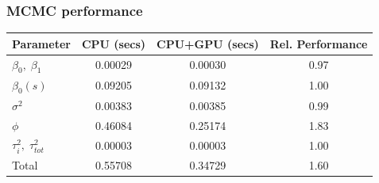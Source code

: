 \documentclass[t]{beamer}\usepackage[]{graphicx}\usepackage[]{color}
\begin{document}
\begin{frame}
\frametitle{MCMC performance}

\begin{center}
\renewcommand*{\arraystretch}{1.5}
\begin{tabular}{l|c|c|c}
Parameter                 & CPU (secs) & CPU+GPU (secs)  & Rel. Performance \\
\hline
$\beta_0, \; \beta_1$     & 0.00029    & 0.00030         & 0.97 \\
$\beta_0(s) $             & 0.09205    & 0.09132         & 1.00 \\
$\sigma^2$                & 0.00383    & 0.00385         & 0.99 \\
$\phi$                    & 0.46084    & 0.25174         & 1.83 \\
$\tau^2_i,\; \tau^2_{tot}$& 0.00003    & 0.00003         & 1.00 \\
\hline
Total                     & 0.55708    & 0.34729         & 1.60
\end{tabular}
\end{center}

\end{frame}

\end{document}
